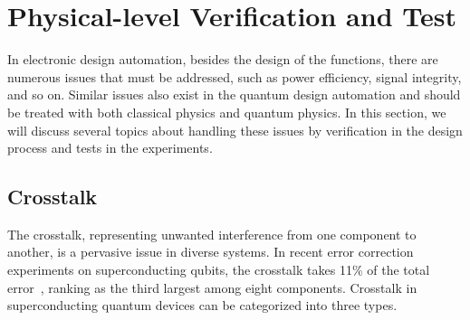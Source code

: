 \documentclass[a4paper,onecolumn,11pt,unpublished]{quantumarticle}
\begin{document}
\section{Physical-level Verification and Test}

In electronic design automation, besides the design of the functions, there are numerous issues that must be addressed, such as power efficiency, signal integrity, and so on. Similar issues also exist in the quantum design automation and should be treated with both classical physics and quantum physics. In this section, we will discuss several topics about handling these issues by verification in the design process and tests in the experiments.

\subsection{Crosstalk}
The crosstalk, representing unwanted interference from one component to another, is a pervasive issue in diverse systems. In recent error correction experiments on superconducting qubits, the crosstalk takes 11\% of the total error~\cite{Acharya2024Quantum}, ranking as the third largest among eight components. Crosstalk in superconducting quantum devices can be categorized into three types. 
\end{document}
